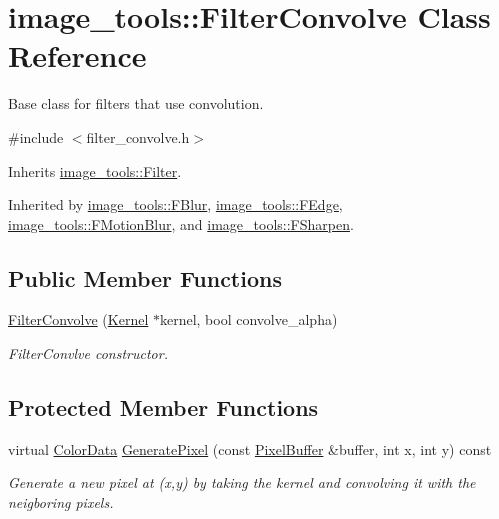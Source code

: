 \hypertarget{classimage__tools_1_1FilterConvolve}{}\section{image\+\_\+tools\+:\+:Filter\+Convolve Class Reference}
\label{classimage__tools_1_1FilterConvolve}


Base class for filters that use convolution.  




{\ttfamily \#include $<$filter\+\_\+convolve.\+h$>$}



Inherits \hyperlink{classimage__tools_1_1Filter}{image\+\_\+tools\+::\+Filter}.



Inherited by \hyperlink{classimage__tools_1_1FBlur}{image\+\_\+tools\+::\+F\+Blur}, \hyperlink{classimage__tools_1_1FEdge}{image\+\_\+tools\+::\+F\+Edge}, \hyperlink{classimage__tools_1_1FMotionBlur}{image\+\_\+tools\+::\+F\+Motion\+Blur}, and \hyperlink{classimage__tools_1_1FSharpen}{image\+\_\+tools\+::\+F\+Sharpen}.

\subsection*{Public Member Functions}
\begin{DoxyCompactItemize}
\item 
\hyperlink{classimage__tools_1_1FilterConvolve_ae5671442eee4070c4aa9d38390653e73}{Filter\+Convolve} (\hyperlink{classimage__tools_1_1Kernel}{Kernel} $\ast$kernel, bool convolve\+\_\+alpha)
\begin{DoxyCompactList}\small\item\em Filter\+Convlve constructor. \end{DoxyCompactList}\end{DoxyCompactItemize}
\subsection*{Protected Member Functions}
\begin{DoxyCompactItemize}
\item 
virtual \hyperlink{classimage__tools_1_1ColorData}{Color\+Data} \hyperlink{classimage__tools_1_1FilterConvolve_ad318986a25e6cd6685e61dff5f99adb5}{Generate\+Pixel} (const \hyperlink{classimage__tools_1_1PixelBuffer}{Pixel\+Buffer} \&buffer, int x, int y) const 
\begin{DoxyCompactList}\small\item\em Generate a new pixel at (x,y) by taking the kernel and convolving it with the neigboring pixels. \end{DoxyCompactList}\end{DoxyCompactItemize}
